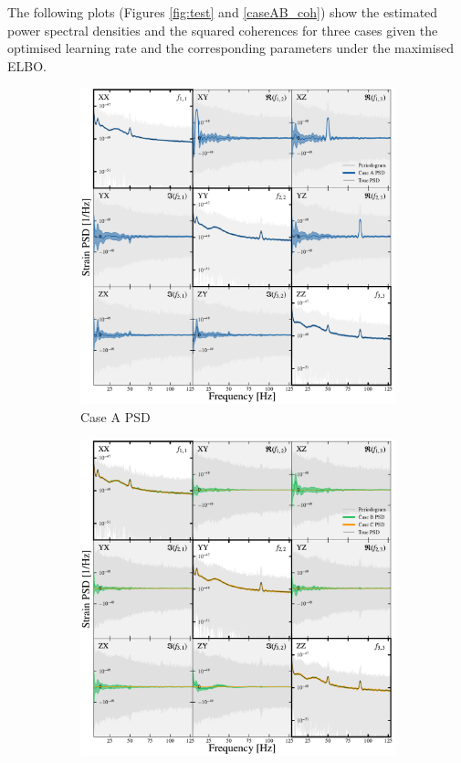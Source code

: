\documentclass[%
 reprint,
 amsmath,amssymb,
 aps,
 nofootinbib,
]{revtex4-2}
\begin{document}
The following plots (Figures \ref{fig:test} and \ref{caseAB_coh}) show the estimated power spectral densities and the squared coherences for three cases given the optimised learning rate and the corresponding parameters under the maximised ELBO.
\begin{figure}[h]
\centering
\begin{subfigure}{\columnwidth}
  \centering
  \includegraphics[width=1.05\columnwidth]{caseA_psd.pdf}
  \caption{Case A PSD}
  \label{fig:caseA_psd}
\end{subfigure}
\hfill
\begin{subfigure}{\columnwidth}
  \centering
  \includegraphics[width=1.05\columnwidth]{caseBC_psd.pdf}

\end{subfigure}
\end{figure}
\end{document}
